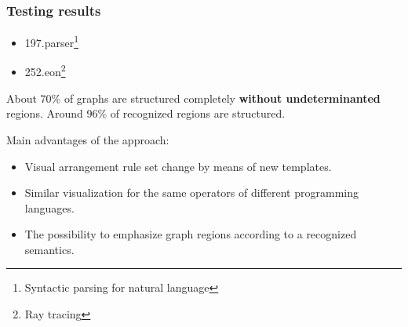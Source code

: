 \documentclass{beamer}
\begin{document}
\begin{frame}
\begin{figure}[htbp]
\begin{minipage}[b]{0.49\linewidth}
	\end{minipage}
\end{figure}
\end{frame}


\begin{frame}
\frametitle{Testing results}
\begin{itemize}
	\item 197.parser\footnote{Syntactic parsing for natural language}
	\item 252.eon\footnote{Ray tracing}
\end{itemize}

About 70\% of graphs are structured completely \textbf{without undeterminanted} regions.  Around 96\% of recognized regions are structured.

Main advantages of the approach:
\begin{itemize}
	\item Visual arrangement rule set change by means of new templates.
	\item Similar visualization for the same operators of different programming languages.
	\item The possibility to emphasize graph regions according to a recognized semantics.
\end{itemize}

\end{frame}

\maketitle
\end{document}
